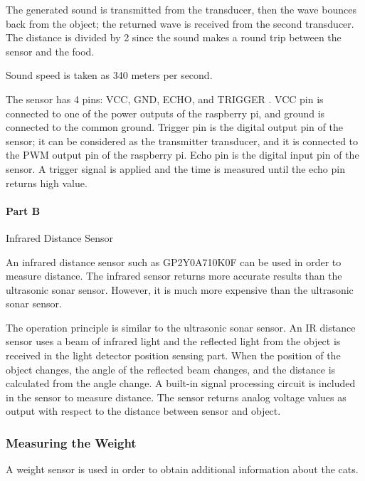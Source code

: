 The generated sound is transmitted from the transducer, then the wave bounces back from the object; the returned wave is received from the second transducer. The distance is divided by 2 since the sound makes a round trip between the sensor and the food.

Sound speed is taken as 340 meters per second. 

The sensor has 4 pins: VCC, GND, ECHO, and TRIGGER \cite{cite:sonar}.
VCC pin is connected to one of the power outputs of the raspberry pi, and ground is connected to the common ground. Trigger pin is the digital output pin of the sensor; it can be considered as the transmitter transducer, and it is connected to the PWM output pin of the raspberry pi. Echo pin is the digital input pin of the sensor. A trigger signal is applied and the time is measured until the echo pin returns high value.

 
 \paragraph{Part B} Infrared Distance Sensor
 
 An infrared distance sensor such as GP2Y0A710K0F can be used in order to measure distance. The infrared sensor returns more accurate results than the ultrasonic sonar sensor. However, it is much more expensive than the ultrasonic sonar sensor.
 
 The operation principle is similar to the ultrasonic sonar sensor. An IR distance sensor uses a beam of infrared light and the reflected light from the object is received in the light detector position sensing part. When the position of the object changes, the angle of the reflected beam changes, and the distance is calculated from the angle change. A built-in signal processing circuit is included in the sensor to measure distance. The sensor returns analog voltage values as output with respect to the distance between sensor and object. \cite{cite:infrared}
 
    \subsubsection{Measuring the Weight}
  
A weight sensor is used in order to obtain additional information about the cats.



